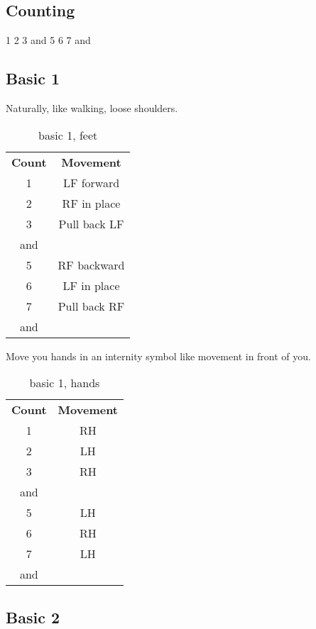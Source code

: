 \subsection{Counting}
1 2 3 and 5 6 7 and

\subsection{Basic 1}
Naturally, like walking, loose shoulders.
\begin{table}[H]
\centering
\begin{tabular}{cc}
  \toprule
  \textbf{Count} & \textbf{Movement}\\
  \cmidrule(lr){1-1}\cmidrule(lr){2-2}
  1 & LF forward\\
  2 & RF in place\\
  3 & Pull back LF\\
  and &\\
  5 & RF backward\\
  6 & LF in place\\
  7 & Pull back RF\\
  and &\\
  \bottomrule
\end{tabular}
\label{basic1_feet}
\caption{basic 1, feet}
\end{table}

Move you hands in an internity symbol like movement in front of you.
\begin{table}[H]
\centering
\begin{tabular}{cc}
  \toprule
  \textbf{Count} & \textbf{Movement}\\
  \cmidrule(lr){1-1}\cmidrule(lr){2-2}
  1 & RH\\
  2 & LH\\
  3 & RH\\
  and & \\
  5 & LH\\
  6 & RH\\
  7 & LH\\
  and & \\
  \bottomrule
\end{tabular}
\label{basic1_hands}
\caption{basic 1, hands}
\end{table}

\subsection{Basic 2}

